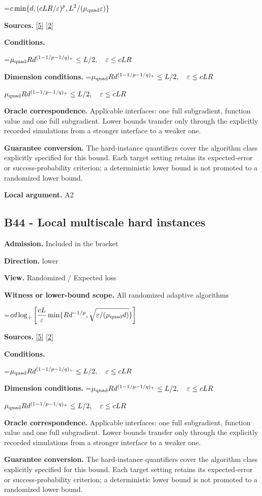 \documentclass[10pt,a4paper]{article}
\newcommand{\AtlasMath}[1]{\par\begingroup\centering\setbox0=\hbox{$\displaystyle #1$}\ifdim\wd0>1.4\linewidth\typeout{ATLAS WIDE FORMULA: \the\wd0}\fi\ifdim\wd0>\linewidth\resizebox{\linewidth}{!}{\box0}\else\box0\fi\par\endgroup}
\newcommand{\AtlasInlineMath}[1]{\begingroup\setbox0=\hbox{$#1$}\ifdim\wd0>.4\linewidth\endgroup\AtlasMath{#1}\else\endgroup$#1$\fi}
\begin{document}
\AtlasMath{c\min\{d,(cLR/\varepsilon)^p,L^2/(\mu_{\rm quad}\varepsilon)\}}
\textbf{Sources.} \href{https://arxiv.org/pdf/1407.5144}{[5]} \href{https://arxiv.org/pdf/1401.1792}{[2]}

\textbf{Conditions.} 
\AtlasMath{\mu_{\rm quad}R d^{(1-1/p-1/q)_+}\le L/2,\quad\varepsilon\le cLR}


\textbf{Dimension conditions.} \AtlasInlineMath{\mu_{\rm quad}R d^{(1-1/p-1/q)_+}\le L/2,\quad\varepsilon\le cLR}

\textbf{Oracle correspondence.} Applicable interfaces: one full subgradient, function value and one full subgradient. Lower bounds transfer only through the explicitly recorded simulations from a stronger interface to a weaker one.

\textbf{Guarantee conversion.} The hard-instance quantifiers cover the algorithm class explicitly specified for this bound. Each target setting retains its expected-error or success-probability criterion; a deterministic lower bound is not promoted to a randomized lower bound.

\textbf{Local argument.} A2

\subsection{B44 - Local multiscale hard instances}
\textbf{Admission.} Included in the bracket

\textbf{Direction.} lower

\textbf{View.} Randomized / Expected loss

\textbf{Witness or lower-bound scope.} All randomized adaptive algorithms

\AtlasMath{cd\log_+\left[\frac{cL}{\varepsilon}\min\{Rd^{-1/p},\sqrt{\varepsilon/(\mu_{\rm quad}d)}\}\right]}
\textbf{Sources.} \href{https://arxiv.org/pdf/1407.5144}{[5]} \href{https://arxiv.org/pdf/1401.1792}{[2]}

\textbf{Conditions.} 
\AtlasMath{\mu_{\rm quad}R d^{(1-1/p-1/q)_+}\le L/2,\quad\varepsilon\le cLR}


\textbf{Dimension conditions.} \AtlasInlineMath{\mu_{\rm quad}R d^{(1-1/p-1/q)_+}\le L/2,\quad\varepsilon\le cLR}

\textbf{Oracle correspondence.} Applicable interfaces: one full subgradient, function value and one full subgradient. Lower bounds transfer only through the explicitly recorded simulations from a stronger interface to a weaker one.

\textbf{Guarantee conversion.} The hard-instance quantifiers cover the algorithm class explicitly specified for this bound. Each target setting retains its expected-error or success-probability criterion; a deterministic lower bound is not promoted to a randomized lower bound.
\end{document}
